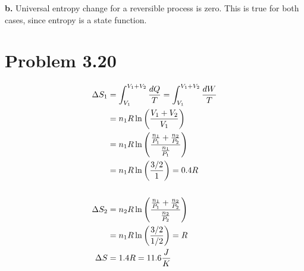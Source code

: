 \documentclass[10pt]{article} %
\begin{document}
\textbf{b.}
Universal entropy change for a reversible process is zero. This is true for both cases, since entropy is a state function.\\

\section{Problem 3.20}
\begin{align*}
  \Delta S_1 &= \int_{V_1}^{V_1+V_2} \frac{dQ}{T} = \int_{V_1}^{V_1+V_2} \frac{dW}{T}\\
  &= n_1R\ln\left(\frac{V_1+V_2}{V_1}\right)\\
  &= n_1R\ln\left(\frac{\frac{n_1}{P_1} + \frac{n_2}{P_2}}{\frac{n_1}{P_1}}\right)\\
  &= n_1R\ln\left(\frac{3/2}{1}\right) = 0.4R\\
  \vspace{1cm}\\
  \Delta S_2 &= n_2R\ln\left(\frac{\frac{n_1}{P_1} + \frac{n_2}{P_2}}{\frac{n_2}{P_2}}\right)\\
  &= n_1R\ln\left(\frac{3/2}{1/2}\right) = R\\
  \vspace{1cm}
  \Delta S &= 1.4R = 11.6 \frac{J}{K}\\
\end{align*}
\end{document}
